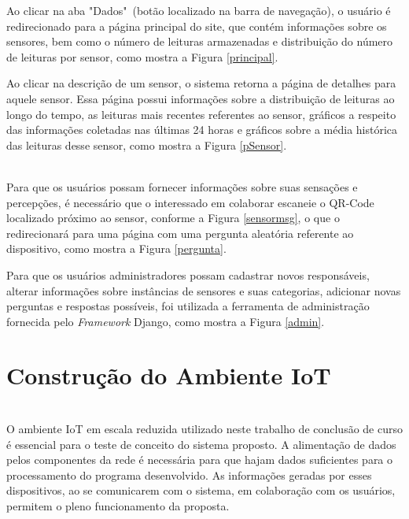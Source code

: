 \newpage
\null \quad Ao clicar na aba "Dados"\ (botão localizado na barra de navegação), o usuário é redirecionado para a página principal do site, que contém informações sobre os sensores, bem como o número de leituras armazenadas e distribuição do número de leituras por sensor, como mostra a Figura \ref{principal}.


\null \quad Ao clicar na descrição de um sensor, o sistema retorna a página de detalhes para aquele sensor. Essa página possui informações sobre a distribuição de leituras ao longo do tempo, as leituras mais recentes referentes ao sensor, gráficos a respeito das informações coletadas nas últimas 24 horas e gráficos sobre a média histórica das leituras desse sensor, como mostra a Figura \ref{pSensor}.



\\\null \quad Para que os usuários possam fornecer informações sobre suas sensações e percepções, é necessário que o interessado em colaborar escaneie o QR-Code localizado próximo ao sensor, conforme a Figura \ref{sensormsg}, o que o redirecionará para uma página com uma pergunta aleatória referente ao dispositivo, como mostra a Figura \ref{pergunta}.


\null \quad Para que os usuários administradores possam cadastrar novos responsáveis, alterar informações sobre instâncias de sensores e suas categorias, adicionar novas perguntas e respostas possíveis, foi utilizada a ferramenta de administração fornecida pelo \textit{Framework} Django, como mostra a Figura \ref{admin}.



\section{Construção do Ambiente IoT}
\label{sec:ambiente}
\\\null \quad O ambiente \acrshort{IoT} em escala reduzida utilizado neste trabalho de conclusão de curso é essencial para o teste de conceito
do sistema proposto. A alimentação de dados pelos componentes da rede é necessária para que hajam
dados suficientes para o processamento do programa desenvolvido. As informações geradas por esses dispositivos, ao se comunicarem com o sistema, em colaboração
com os usuários, permitem o pleno funcionamento da proposta.

